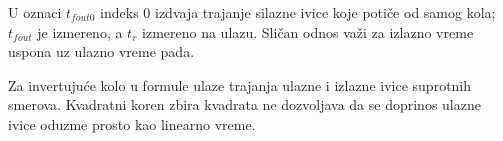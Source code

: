 U oznaci $t_{fout0}$ indeks 0 izdvaja trajanje silazne ivice koje potiče od samog kola; $t_{fout}$ je izmereno, a $t_r$ izmereno na ulazu. Sličan odnos važi za izlazno vreme uspona uz ulazno vreme pada.

Za invertujuće kolo u formule ulaze trajanja ulazne i izlazne ivice suprotnih smerova. Kvadratni koren zbira kvadrata ne dozvoljava da se doprinos ulazne ivice oduzme prosto kao linearno vreme.
